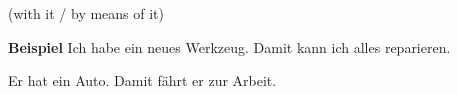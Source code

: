 (with it / by means of it)

\textbf{Beispiel}
Ich habe ein neues Werkzeug. Damit kann ich alles reparieren.

Er hat ein Auto. Damit fährt er zur Arbeit.
